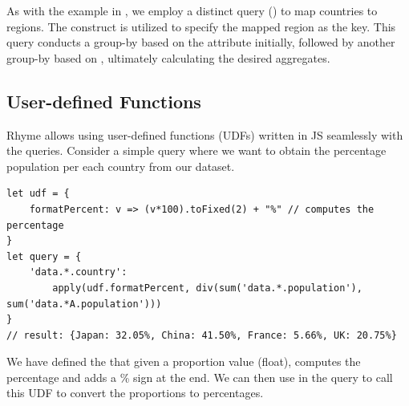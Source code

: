 \documentclass[runningheads]{llncs}
\newcommand{\lang}{Rhyme}
\begin{document}
As with the example in , we employ a distinct query
() to map countries to regions.
The  construct is utilized to specify the mapped region
as the key.
This query conducts a group-by based on the  attribute initially,
followed by another group-by based on , ultimately calculating the
desired aggregates.





\subsection{User-defined Functions}
\lang{} allows using user-defined functions (UDFs) written in JS seamlessly with the
queries.
Consider a simple query where we want to obtain the percentage population per each
country from our dataset.

\begin{lstlisting}[style=JavaScript, columns=flexible]
let udf = {
    formatPercent: v => (v*100).toFixed(2) + "%" // computes the percentage 
}
let query = {
    'data.*.country':
        apply(udf.formatPercent, div(sum('data.*.population'), sum('data.*A.population')))
}
// result: {Japan: 32.05%, China: 41.50%, France: 5.66%, UK: 20.75%}
\end{lstlisting}

We have defined the  that given a proportion value (float),
computes the percentage and adds a \% sign at the end.
We can then use  in the query to call this UDF to convert the
proportions to percentages.
\end{document}
